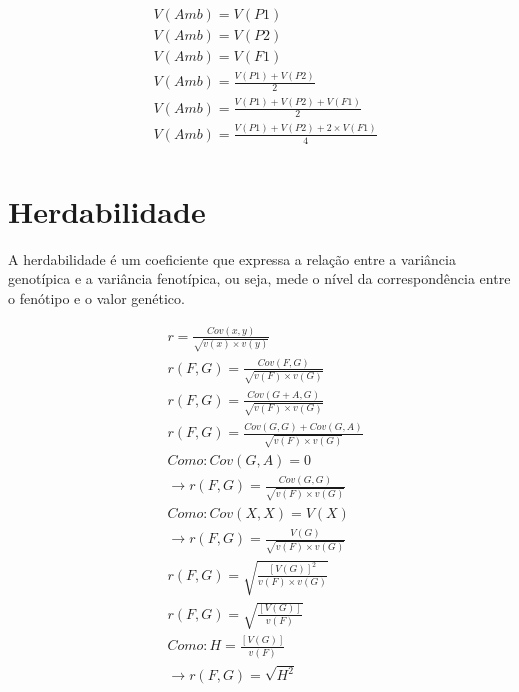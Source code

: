\begin{definition}

\begin{align}
&  V(Amb) = V(P1) \\
&  V(Amb) = V(P2) \\
&  V(Amb) = V(F1) \\
&  V(Amb) = \frac{V(P1) + V(P2)}{2} \\
&  V(Amb) = \frac{V(P1) + V(P2) + V(F1)}{2} \\
&  V(Amb) = \frac{V(P1) + V(P2) + 2 \times V(F1)}{4} \\
\end{align}
\end{definition}


\section{Herdabilidade}

A herdabilidade é um coeficiente que expressa a relação entre a variância genotípica e a variância fenotípica, ou seja, mede o nível da correspondência entre o fenótipo e o valor genético. 

\begin{definition}

\begin{align}
&  r = \frac{Cov(x,y)}{\sqrt{v(x) \times v(y)}} \\
&  r(F,G) = \frac{Cov(F,G)}{\sqrt{v(F) \times v(G)}} \\
&  r(F,G) = \frac{Cov(G+A,G)}{\sqrt{v(F) \times v(G)}} \\
&  r(F,G) = \frac{Cov(G,G) + Cov(G,A)}{\sqrt{v(F) \times v(G)}} \\
&  Como: Cov(G,A) = 0 \\
&  \rightarrow r(F,G) = \frac{Cov(G,G)}{\sqrt{v(F) \times v(G)}} \\
&  Como: Cov(X,X) = V(X) \\
&  \rightarrow r(F,G) = \frac{V(G)}{\sqrt{v(F) \times v(G)}} \\
&  r(F,G) = \sqrt{\frac{[V(G)]^2}{v(F) \times v(G)}} \\
&  r(F,G) = \sqrt{\frac{[V(G)]}{v(F)}} \\
&  Como: H = \frac{[V(G)]}{v(F)} \\
&  \rightarrow  r(F,G) = \sqrt{H^2} \\
\end{align}
\end{definition}


